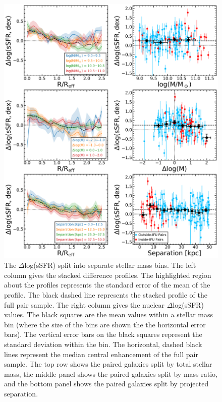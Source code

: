\documentclass[iop,revtex4,twocolumn,apj,numberedappendix,appendixfloats]{emulateapj}
\begin{document}
\begin{figure}
\centering
\includegraphics[width=\linewidth]{fig/ssfr_full.pdf}
\caption[]{The $\Delta$log(sSFR) split into separate stellar mass bins. The left column gives the stacked difference profiles. The highlighted region about the profiles represents the standard error of the mean of the profile. The black dashed line represents the stacked profile of the full pair sample. The right column gives the nuclear $\Delta$log(sSFR) values. The black squares are the mean values within a stellar mass bin (where the size of the bins are shown the the horizontal error bars). The vertical error bars on the black squares represent the standard deviation within the bin. The horizontal, dashed black lines represent the median central enhancement of the full pair sample. The top row shows the paired galaxies split by total stellar mass, the middle panel shows the paired galaxies split by mass ratio, and the bottom panel shows the paired galaxies split by projected separation. }
\label{fig:ssfr_full}
\end{figure}
\end{document}
